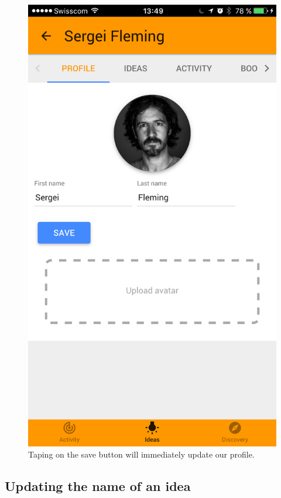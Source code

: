 \documentclass[a4paper,12pt,twoside]{article}
\begin{document}
\begin{figure}[!htb]
\begin{minipage}[t]{.32\textwidth}
    \end{minipage}
    \hfill
    \begin{minipage}[t]{.32\textwidth}
        \centering
        \includegraphics[width=\textwidth]{images/flow_completingProfile_3.png}
        \caption{Taping on the save button will immediately update our profile.}
    \end{minipage}
\end{figure}

\clearpage
\subsection{Updating the name of an idea}
\label{sec.updatingIdeaName}
\end{document}
